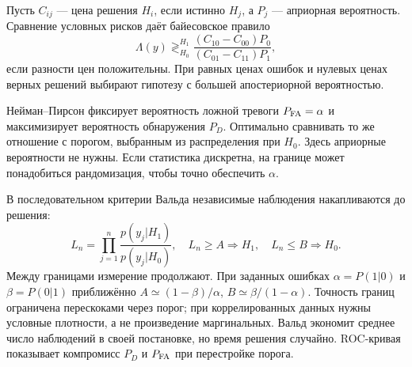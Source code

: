 
Пусть $C_{ij}$ — цена решения $H_i$, если истинно $H_j$, а $P_j$ — априорная вероятность. Сравнение условных рисков даёт байесовское правило
\begin{equation}
 \Lambda(y)\mathop{\gtrless}_{H_0}^{H_1}
 \frac{(C_{10}-C_{00})P_0}{(C_{01}-C_{11})P_1},
\end{equation}
если разности цен положительны. При равных ценах ошибок и нулевых ценах верных решений выбирают гипотезу с большей апостериорной вероятностью.

Нейман–Пирсон фиксирует вероятность ложной тревоги $P_{\rm FA}=\alpha$ и максимизирует вероятность обнаружения $P_D$. Оптимально сравнивать то же отношение с порогом, выбранным из распределения при $H_0$. Здесь априорные вероятности не нужны. Если статистика дискретна, на границе может понадобиться рандомизация, чтобы точно обеспечить $\alpha$.

В последовательном критерии Вальда независимые наблюдения накапливаются до решения:
\begin{equation}
 L_n=\prod_{j=1}^n\frac{p(y_j|H_1)}{p(y_j|H_0)},\quad
 L_n\geq A\Rightarrow H_1,\quad L_n\leq B\Rightarrow H_0.
\end{equation}
Между границами измерение продолжают. При заданных ошибках $\alpha=P(1|0)$ и $\beta=P(0|1)$ приближённо $A\simeq(1-\beta)/\alpha$, $B\simeq\beta/(1-\alpha)$. Точность границ ограничена перескоками через порог; при коррелированных данных нужны условные плотности, а не произведение маргинальных. Вальд экономит среднее число наблюдений в своей постановке, но время решения случайно. ROC-кривая показывает компромисс $P_D$ и $P_{\rm FA}$ при перестройке порога.
